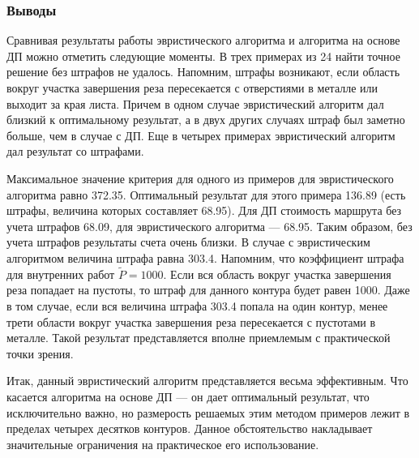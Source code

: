 \subsubsection*{Выводы}

Сравнивая результаты работы эвристического алгоритма и
алгоритма на основе ДП можно отметить следующие моменты.
В трех примерах из 24 найти точное решение без штрафов не удалось.
Напомним, штрафы возникают,
если область вокруг участка завершения реза пересекается с отверстиями в металле
или выходит за края листа.
Причем в одном случае эвристический алгоритм дал близкий к оптимальному результат,
а в двух других случаях штраф был заметно больше, чем в случае с ДП.
Еще в четырех примерах эвристический алгоритм дал
результат со штрафами.

Максимальное значение критерия для одного из примеров
для эвристического алгоритма равно 372.35.
Оптимальный результат для этого примера 136.89
(есть штрафы, величина которых составляет 68.95).
Для ДП стоимость маршрута без учета штрафов 68.09,
для эвристического алгоритма --- 68.95.
Таким образом, без учета штрафов результаты счета очень близки.
В случае с эвристическим алгоритмом величина штрафа равна 303.4.
Напомним, что коэффициент штрафа для внутренних работ $\tilde{P}=1000$.
Если вся область вокруг участка завершения реза попадает на пустоты,
то штраф для данного контура будет равен 1000.
Даже в том случае, если вся величина штрафа 303.4 попала на один контур,
менее трети области вокруг участка завершения реза пересекается с пустотами в металле.
Такой результат представляется вполне приемлемым с практической точки зрения.

Итак, данный эвристический алгоритм представляется весьма эффективным.
Что касается алгоритма на основе ДП --- он дает оптимальный результат,
что исключительно важно,
но размерость решаемых этим методом примеров лежит в пределах четырех десятков контуров.
Данное обстоятельство накладывает значительные ограничения на практическое его использование.
